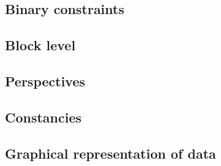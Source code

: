 \subsection{Binary constraints}                                             \label{user txn data: generalities: binary}                         
\subsection{Block level}                                                    \label{user txn data: generalities: block level}                    
\subsection{Perspectives}                                                   \label{user txn data: generalities: perspectives}                   
\subsection{Constancies}                                                    \label{user txn data: generalities: constancies}                    
\subsection{Graphical representation of data}                               \label{user txn data: generalities: graphical representation}       
